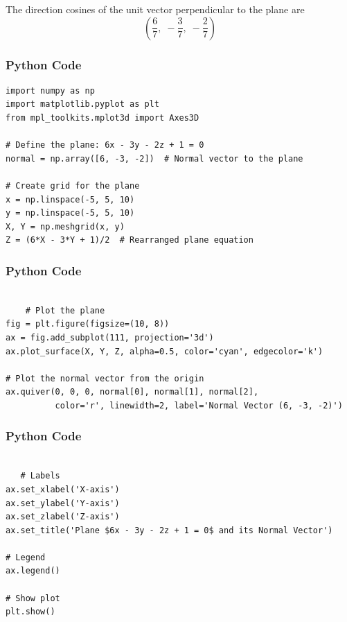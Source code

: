 \documentclass{beamer}
\begin{document}
The direction cosines of the unit vector perpendicular to the plane are 
\[
    \left(
        \frac{6}{7},\;
        -\frac{3}{7},\;
        -\frac{2}{7}
    \right)
\]


\begin{frame}[fragile]
    \frametitle{Python Code}
    \begin{lstlisting}
import numpy as np
import matplotlib.pyplot as plt
from mpl_toolkits.mplot3d import Axes3D

# Define the plane: 6x - 3y - 2z + 1 = 0
normal = np.array([6, -3, -2])  # Normal vector to the plane

# Create grid for the plane
x = np.linspace(-5, 5, 10)
y = np.linspace(-5, 5, 10)
X, Y = np.meshgrid(x, y)
Z = (6*X - 3*Y + 1)/2  # Rearranged plane equation

     \end{lstlisting}
\end{frame}


\begin{frame}[fragile]
    \frametitle{Python Code}
    \begin{lstlisting}

    # Plot the plane
fig = plt.figure(figsize=(10, 8))
ax = fig.add_subplot(111, projection='3d')
ax.plot_surface(X, Y, Z, alpha=0.5, color='cyan', edgecolor='k')

# Plot the normal vector from the origin
ax.quiver(0, 0, 0, normal[0], normal[1], normal[2], 
          color='r', linewidth=2, label='Normal Vector (6, -3, -2)')

     \end{lstlisting}
\end{frame}


\begin{frame}[fragile]
    \frametitle{Python Code}
    \begin{lstlisting}

   # Labels
ax.set_xlabel('X-axis')
ax.set_ylabel('Y-axis')
ax.set_zlabel('Z-axis')
ax.set_title('Plane $6x - 3y - 2z + 1 = 0$ and its Normal Vector')

# Legend
ax.legend()

# Show plot
plt.show()

     \end{lstlisting}
\end{frame}
\end{document}
